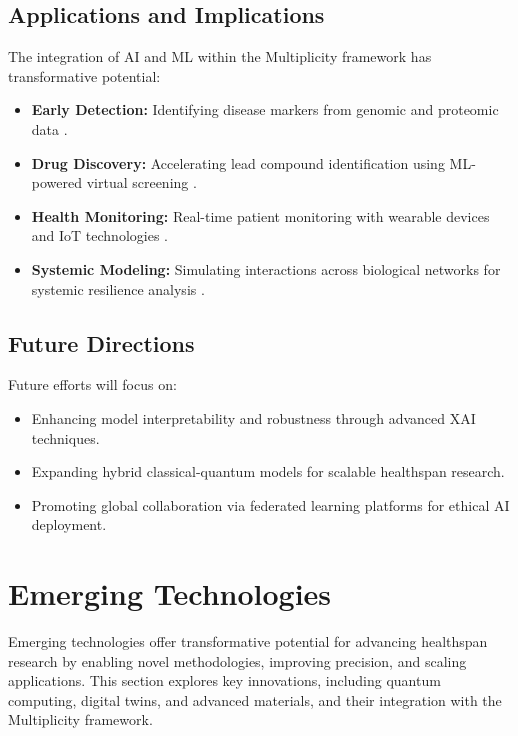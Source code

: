 \documentclass{article}
\theoremstyle{plain}
\begin{document}
\subsection{Applications and Implications}
The integration of AI and ML within the Multiplicity framework has transformative potential:
\begin{itemize}
    \item \textbf{Early Detection:} Identifying disease markers from genomic and proteomic data \cite{earlyDetectionAI2022}.
    \item \textbf{Drug Discovery:} Accelerating lead compound identification using ML-powered virtual screening \cite{drugDiscoveryAI2023}.
    \item \textbf{Health Monitoring:} Real-time patient monitoring with wearable devices and IoT technologies \cite{iotHealth2023}.
    \item \textbf{Systemic Modeling:} Simulating interactions across biological networks for systemic resilience analysis \cite{systemicModeling2023}.
\end{itemize}

\subsection{Future Directions}
Future efforts will focus on:
\begin{itemize}
    \item Enhancing model interpretability and robustness through advanced XAI techniques.
    \item Expanding hybrid classical-quantum models for scalable healthspan research.
    \item Promoting global collaboration via federated learning platforms for ethical AI deployment.
\end{itemize}

\section{Emerging Technologies}
\label{sec:emerging_technologies}

Emerging technologies offer transformative potential for advancing healthspan research by enabling novel methodologies, improving precision, and scaling applications. This section explores key innovations, including quantum computing, digital twins, and advanced materials, and their integration with the Multiplicity framework.
\end{document}
